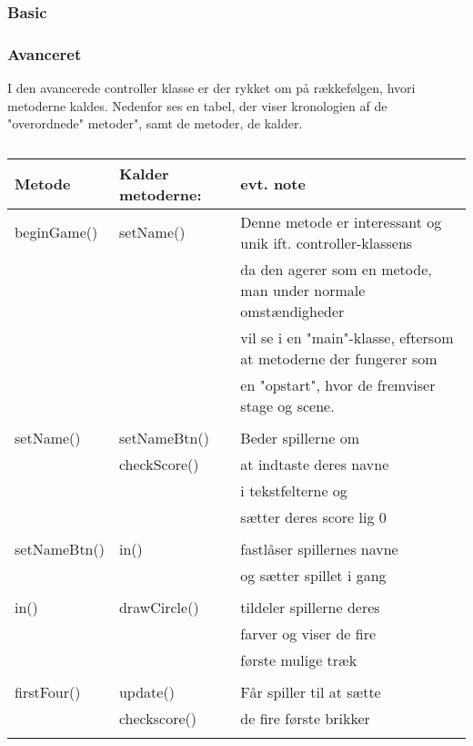 \subsubsection{Basic}

\subsubsection{Avanceret}
I den avancerede controller klasse er der rykket om på rækkefølgen, hvori metoderne kaldes. Nedenfor ses en tabel, der viser kronologien af de "overordnede" metoder", samt de metoder, de kalder.
\begin{table}[H]
\centering
\caption{}\label{tbl:}
\begin{tabular}{lll}
\toprule
Metode & Kalder metoderne: & evt. note \\
\midrule
beginGame() & setName() & Denne metode er interessant og unik ift. controller-klassens \\
&& da den agerer som en metode, man under normale omstændigheder \\
&& vil se i en "main"-klasse, eftersom at metoderne der fungerer som \\
&& en "opstart", hvor de fremviser stage og scene. \\
& \\

setName() & setNameBtn() & Beder spillerne om \\ 
& checkScore() & at indtaste deres navne \\
&& i tekstfelterne og \\
&& sætter deres score lig 0\\
& \\

setNameBtn() & in() & fastlåser spillernes navne \\
&& og sætter spillet i gang\\
& \\

in() & drawCircle() & tildeler spillerne deres \\
&& farver og viser de fire \\
&& første mulige træk \\
& \\

firstFour() & update() & Får spiller til at sætte \\
& checkscore() & de fire første brikker\\
& \\


\end{tabular}
\end{table}

